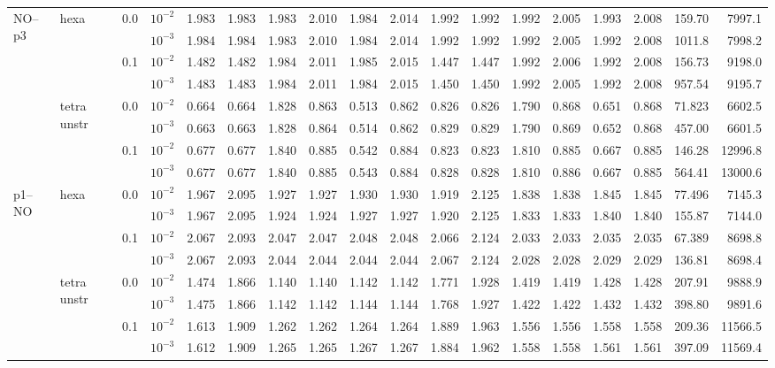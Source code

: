 \begin{longtable}{llclrrrrrrrrrrrrrr}
\multirow{8}{*}{NO--p3} & \multirow{4}{*}{hexa} & \multirow{2}{*}{0.0} & $10^{-2}$ & 1.983 & 1.983 & 1.983 & 2.010 & 1.984 & 2.014 & 1.992 & 1.992 & 1.992 & 2.005 & 1.993 & 2.008 & 159.70 & 7997.1 \\
& & & $10^{-3}$ & 1.984 & 1.984 & 1.983 & 2.010 & 1.984 & 2.014 & 1.992 & 1.992 & 1.992 & 2.005 & 1.992 & 2.008 & 1011.8 & 7998.2 \\\cline{3-18}
& & \multirow{2}{*}{0.1} & $10^{-2}$ & 1.482 & 1.482 & 1.984 & 2.011 & 1.985 & 2.015 & 1.447 & 1.447 & 1.992 & 2.006 & 1.992 & 2.008 & 156.73 & 9198.0 \\
& & & $10^{-3}$ & 1.483 & 1.483 & 1.984 & 2.011 & 1.984 & 2.015 & 1.450 & 1.450 & 1.992 & 2.005 & 1.992 & 2.008 & 957.54 & 9195.7 \\\cline{2-18}
& \multirow{4}{*}{tetra unstr} & \multirow{2}{*}{0.0} & $10^{-2}$ & 0.664 & 0.664 & 1.828 & 0.863 & 0.513 & 0.862 & 0.826 & 0.826 & 1.790 & 0.868 & 0.651 & 0.868 & 71.823 & 6602.5 \\
& & & $10^{-3}$ & 0.663 & 0.663 & 1.828 & 0.864 & 0.514 & 0.862 & 0.829 & 0.829 & 1.790 & 0.869 & 0.652 & 0.868 & 457.00 & 6601.5 \\\cline{3-18}
& & \multirow{2}{*}{0.1} & $10^{-2}$ & 0.677 & 0.677 & 1.840 & 0.885 & 0.542 & 0.884 & 0.823 & 0.823 & 1.810 & 0.885 & 0.667 & 0.885 & 146.28 & 12996.8 \\
& & & $10^{-3}$ & 0.677 & 0.677 & 1.840 & 0.885 & 0.543 & 0.884 & 0.828 & 0.828 & 1.810 & 0.886 & 0.667 & 0.885 & 564.41 & 13000.6 \\\hline

\multirow{8}{*}{p1--NO} & \multirow{4}{*}{hexa} & \multirow{2}{*}{0.0} & $10^{-2}$ & 1.967 & 2.095 & 1.927 & 1.927 & 1.930 & 1.930 & 1.919 & 2.125 & 1.838 & 1.838 & 1.845 & 1.845 & 77.496 & 7145.3 \\
& & & $10^{-3}$ & 1.967 & 2.095 & 1.924 & 1.924 & 1.927 & 1.927 & 1.920 & 2.125 & 1.833 & 1.833 & 1.840 & 1.840 & 155.87 & 7144.0 \\\cline{3-18}
& & \multirow{2}{*}{0.1} & $10^{-2}$ & 2.067 & 2.093 & 2.047 & 2.047 & 2.048 & 2.048 & 2.066 & 2.124 & 2.033 & 2.033 & 2.035 & 2.035 & 67.389 & 8698.8 \\
& & & $10^{-3}$ & 2.067 & 2.093 & 2.044 & 2.044 & 2.044 & 2.044 & 2.067 & 2.124 & 2.028 & 2.028 & 2.029 & 2.029 & 136.81 & 8698.4 \\\cline{2-18}
& \multirow{4}{*}{tetra unstr} & \multirow{2}{*}{0.0} & $10^{-2}$ & 1.474 & 1.866 & 1.140 & 1.140 & 1.142 & 1.142 & 1.771 & 1.928 & 1.419 & 1.419 & 1.428 & 1.428 & 207.91 & 9888.9 \\
& & & $10^{-3}$ & 1.475 & 1.866 & 1.142 & 1.142 & 1.144 & 1.144 & 1.768 & 1.927 & 1.422 & 1.422 & 1.432 & 1.432 & 398.80 & 9891.6 \\\cline{3-18}
& & \multirow{2}{*}{0.1} & $10^{-2}$ & 1.613 & 1.909 & 1.262 & 1.262 & 1.264 & 1.264 & 1.889 & 1.963 & 1.556 & 1.556 & 1.558 & 1.558 & 209.36 & 11566.5 \\
& & & $10^{-3}$ & 1.612 & 1.909 & 1.265 & 1.265 & 1.267 & 1.267 & 1.884 & 1.962 & 1.558 & 1.558 & 1.561 & 1.561 & 397.09 & 11569.4 \\\hline


\end{longtable}
